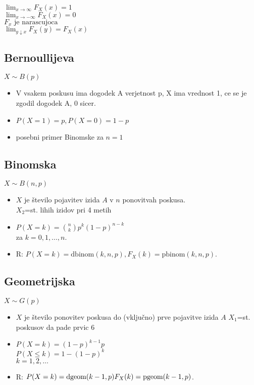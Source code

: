 $\lim_{x\to\infty}F_X(x)=1$\\
$\lim_{x\to-\infty}F_X(x)=0$\\
$F_x \text{ je narascujoca}$\\
$\lim_{y\downarrow x}F_X(y)=F_X(x)$\\

\subsection{Bernoullijeva}
$X\sim B(p)$
\begin{itemize}[leftmargin=*]
\item V vsakem poskusu ima dogodek A verjetnost p, X ima vrednost 1, ce se je 
zgodil dogodek A, 0 sicer.
\item $P(X=1)=p, P(X=0)=1-p$
\item posebni primer Binomske za $n=1$
\end{itemize}

\subsection{Binomska}
$X\sim B(n,p)$
\begin{itemize}[leftmargin=*]
\item $X$ je \v stevilo pojavitev izida $A$ v $n$ ponovitvah poskusa.\\
$X_2$=st. lihih izidov pri 4 metih
\item $\displaystyle P(X=k)=\binom{n}{k}p^k (1-p)^{n-k}$\\ za $k=0,1,\ldots,n$.
\item R: $P(X=k)=\text{dbinom}(k,n,p), F_X(k)=\text{pbinom}(k,n,p)$.
\end{itemize}

\subsection{Geometrijska}
$X\sim G(p)$
\begin{itemize}[leftmargin=*]
\item $X$ je število ponovitev poskusa do (vključno) prve pojavitve izida $A$
$X_1$=st. poskusov da pade prvic 6
\item $\displaystyle P(X=k)=(1-p)^{k-1}p$\\ 
$\displaystyle P(X\le k) = 1 - (1-p)^k$\\$k=1,2,\ldots$
\item R: $P(X=k)=\text{dgeom}(k-1,p)\\ F_X(k)=\text{pgeom}(k-1,p)$.
\end{itemize}


